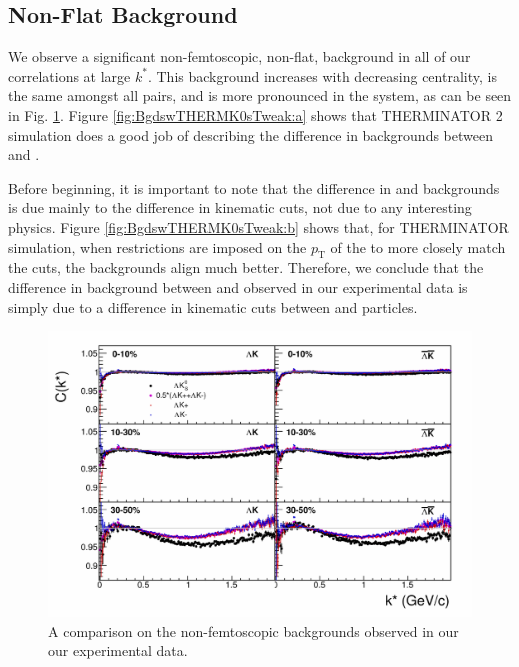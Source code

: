 \documentclass[../AnalysisNoteJBuxton.tex]{subfiles}
\begin{document}
\subsection{Non-Flat Background}
\label{NonFlatBackground}

We observe a significant non-femtoscopic, non-flat, background in all of our correlations at large $k^{*}$.  This background increases with decreasing centrality, is the same amongst all \LamKpm pairs, and is more pronounced in the \LamKs system, as can be seen in Fig. \ref{fig:CompareAllBgds}.  Figure \ref{fig:BgdswTHERMK0sTweak:a} shows that THERMINATOR 2 simulation does a good job of describing the difference in backgrounds between \LamKpm and \LamKs.

Before beginning, it is important to note that the difference in \LamKpm and \LamKs backgrounds is due mainly to the difference in kinematic cuts, not due to any interesting physics.  Figure \ref{fig:BgdswTHERMK0sTweak:b} shows that, for THERMINATOR simulation, when restrictions are imposed on the $p_{\textrm{T}}$ of the \Ks to more closely match the \Kpm cuts, the backgrounds align much better.  Therefore, we conclude that the difference in background between \LamKpm and \LamKs observed in our experimental data is simply due to a difference in kinematic cuts between \Kpm and \Ks particles.

\begin{figure}[h]
  \centering
  \includegraphics[width=\textwidth]{5_Fitting/Figures/CompareLamKchAvgToLamK0_wIndivKch_0010_1030_3050.pdf}
  \caption[Compare Non-Femtoscopic Backgrounds]{A comparison on the non-femtoscopic backgrounds observed in our our \LamK experimental data.}
  \label{fig:CompareAllBgds}
\end{figure}
\end{document}
